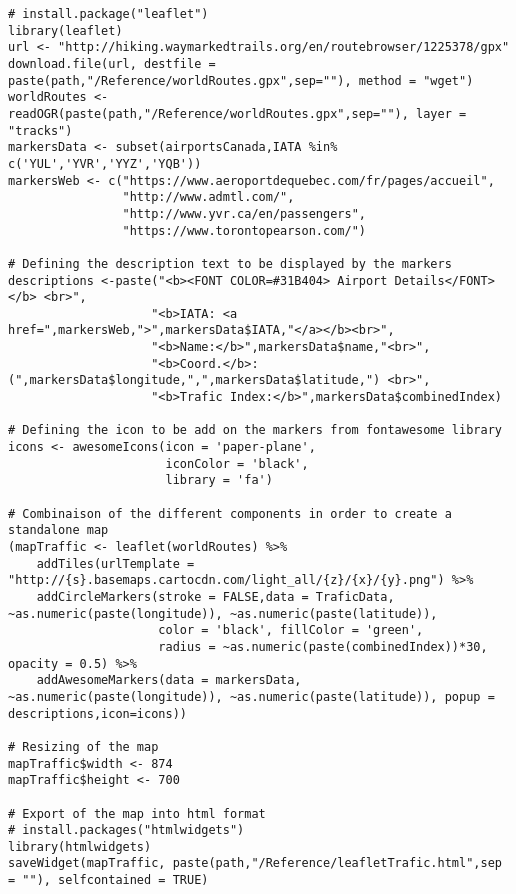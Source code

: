 
\begin{lstlisting}[caption = Générer une carte du trafic aérien avec \texttt{leaflet},label=src:leaflet]
# install.package("leaflet")
library(leaflet)
url <- "http://hiking.waymarkedtrails.org/en/routebrowser/1225378/gpx"
download.file(url, destfile = paste(path,"/Reference/worldRoutes.gpx",sep=""), method = "wget")
worldRoutes <- readOGR(paste(path,"/Reference/worldRoutes.gpx",sep=""), layer = "tracks")
markersData <- subset(airportsCanada,IATA %in% c('YUL','YVR','YYZ','YQB'))
markersWeb <- c("https://www.aeroportdequebec.com/fr/pages/accueil",
                "http://www.admtl.com/",
                "http://www.yvr.ca/en/passengers",
                "https://www.torontopearson.com/")

# Defining the description text to be displayed by the markers
descriptions <-paste("<b><FONT COLOR=#31B404> Airport Details</FONT></b> <br>",
                    "<b>IATA: <a href=",markersWeb,">",markersData$IATA,"</a></b><br>",
                    "<b>Name:</b>",markersData$name,"<br>",
                    "<b>Coord.</b>: (",markersData$longitude,",",markersData$latitude,") <br>",
                    "<b>Trafic Index:</b>",markersData$combinedIndex)

# Defining the icon to be add on the markers from fontawesome library
icons <- awesomeIcons(icon = 'paper-plane',
                      iconColor = 'black',
                      library = 'fa')

# Combinaison of the different components in order to create a standalone map
(mapTraffic <- leaflet(worldRoutes) %>%
    addTiles(urlTemplate = "http://{s}.basemaps.cartocdn.com/light_all/{z}/{x}/{y}.png") %>%
    addCircleMarkers(stroke = FALSE,data = TraficData, ~as.numeric(paste(longitude)), ~as.numeric(paste(latitude)),
                     color = 'black', fillColor = 'green',
                     radius = ~as.numeric(paste(combinedIndex))*30, opacity = 0.5) %>%
    addAwesomeMarkers(data = markersData, ~as.numeric(paste(longitude)), ~as.numeric(paste(latitude)), popup = descriptions,icon=icons))

# Resizing of the map
mapTraffic$width <- 874
mapTraffic$height <- 700

# Export of the map into html format
# install.packages("htmlwidgets")
library(htmlwidgets)
saveWidget(mapTraffic, paste(path,"/Reference/leafletTrafic.html",sep = ""), selfcontained = TRUE)
\end{lstlisting}

